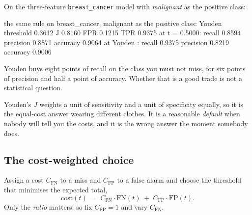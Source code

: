 \documentclass[11pt]{article}
\newcommand{\FP}{\mathrm{FP}}
\newcommand{\FN}{\mathrm{FN}}
\begin{document}
On the three-feature \texttt{breast\_cancer} model with \emph{malignant} as the
positive class:

\begin{codeout}
the same rule on breast_cancer, malignant as the positive class:
  Youden threshold 0.3612   J 0.8160   FPR 0.1215   TPR 0.9375
  at t = 0.5000: recall 0.8594  precision 0.8871  accuracy 0.9064
  at Youden    : recall 0.9375  precision 0.8219  accuracy 0.9006
\end{codeout}

Youden buys eight points of recall on the class you must not miss, for six points
of precision and half a point of accuracy. Whether that is a good trade is not a
statistical question.

\begin{caution}
Youden's $J$ weights a unit of sensitivity and a unit of specificity equally, so
it is the equal-cost answer wearing different clothes. It is a reasonable
\emph{default} when nobody will tell you the costs, and it is the wrong answer
the moment somebody does.
\end{caution}

\subsection{The cost-weighted choice}

Assign a cost $C_{\FN}$ to a miss and $C_{\FP}$ to a false alarm and choose the
threshold that minimises the expected total,
\begin{equation}
\text{cost}(t) \;=\; C_{\FN} \cdot \FN(t) \;+\; C_{\FP} \cdot \FP(t).
\label{eq:cost}
\end{equation}
Only the \emph{ratio} matters, so fix $C_{\FP} = 1$ and vary $C_{\FN}$.
\end{document}
